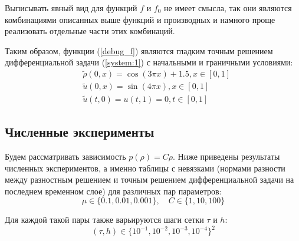 Выписывать явный вид для функций $f$ и $f_{0}$ не имеет смысла, так они являются комбинациями описанных выше функций и производных и намного проще реализовать отдельные части этих комбинаций.

Таким образом, функции (\ref{debug_f}) являются гладким точным решением дифференциальной задачи (\ref{system:1}) с начальными и граничными условиями:
\begin{equation*}
\begin{aligned}
  & \tilde{\rho}(0,x) = \cos(3 \pi x) + 1.5, x \in [0,1] \\
  & \tilde{u}(0,x) = \sin(4 \pi x), x \in[0,1] \\
  & \tilde{u}(t,0) = u(t,1) = 0, t \in [0,1]
\end{aligned}
\end{equation*}

\subsection{Численные эксперименты}
Будем рассматривать зависимость $p(\rho) = C \rho$.
Ниже приведены результаты численных экспериментов, а именно таблицы с невязками (нормами разности между разностным решением и точным решением дифференциальной задачи на последнем временном слое) для различных пар параметров:
$$ \mu \in \{0.1, 0.01, 0.001\}, \quad C \in \{1, 10, 100\} $$

Для каждой такой пары также варьируются шаги сетки $\tau$ и $h$:
$$ (\tau, h) \in \{ 10^{-1}, 10^{-2}, 10^{-3}, 10^{-4} \}^2 $$ 

\newpage